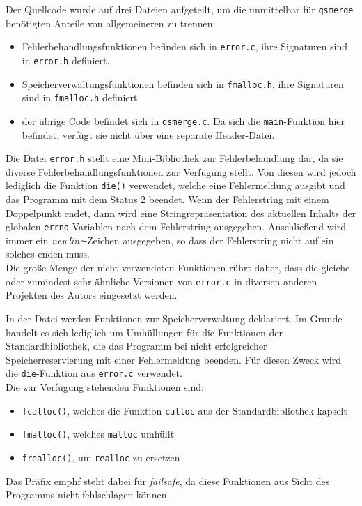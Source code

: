 \documentclass[a4paper,titlepage,12pt]{scrartcl}
\begin{document}
Der Quellcode wurde auf drei Dateien aufgeteilt,
um die unmittelbar für \texttt{qsmerge} benötigten Anteile von allgemeineren zu trennen:
\begin{itemize}
\item Fehlerbehandlungsfunktionen befinden sich in \texttt{error.c},
ihre Signaturen sind in \texttt{error.h} definiert.
\item Speicherverwaltungsfunktionen befinden sich in \texttt{fmalloc.h},
ihre Signaturen sind in \texttt{fmalloc.h} definiert.
\item der übrige Code befindet sich in \texttt{qsmerge.c}.
Da sich die \texttt{main}-Funktion hier befindet,
verfügt sie nicht über eine separate Header-Datei.
\end{itemize}

Die Datei \texttt{error.h} stellt eine Mini-Bibliothek zur Fehlerbehandlung dar,
da sie diverse Fehlerbehandlungsfunktionen zur Verfügung stellt.
Von diesen wird jedoch lediglich die Funktion \texttt{die()} verwendet,
welche eine Fehlermeldung ausgibt und das Programm mit dem Status 2 beendet.
Wenn der Fehlerstring mit einem Doppelpunkt endet,
dann wird eine Stringrepräsentation des aktuellen Inhalts der globalen \texttt{errno}-Variablen nach dem Fehlerstring ausgegeben.
Anschließend wird immer ein \emph{newline}-Zeichen ausgegeben,
so dass der Fehlerstring nicht auf ein solches enden muss.
\\
Die große Menge der nicht verwendeten Funktionen rührt daher,
dass die gleiche oder zumindest sehr ähnliche Versionen von \texttt{error.c} in diversen anderen Projekten des Autors eingesetzt werden.

In der Datei werden Funktionen zur Speicherverwaltung deklariert.
Im Grunde handelt es sich lediglich um Umhüllungen für die Funktionen der Standardbibliothek,
die das Programm bei nicht erfolgreicher Speicherreservierung mit einer Fehlermeldung beenden.
Für diesen Zweck wird die \texttt{die}-Funktion aus \texttt{error.c} verwendet.
\\
Die zur Verfügung stehenden Funktionen sind:
\begin{itemize}
\item \texttt{fcalloc()}, welches die Funktion \texttt{calloc} aus der Standardbibliothek kapselt
\item \texttt{fmalloc()}, welches \texttt{malloc} umhüllt
\item \texttt{frealloc()}, um \texttt{realloc} zu ersetzen
\end{itemize}
Das Präfix emph{f} steht dabei für \emph{failsafe},
da diese Funktionen aus Sicht des Programms nicht fehlschlagen können.
\end{document}

